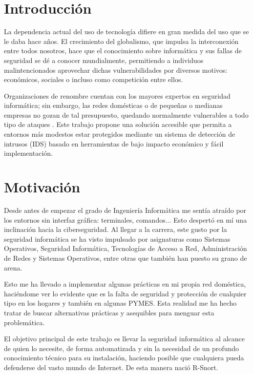 \documentclass[12pt,a4paper]{report}
\begin{document}
\chapter*{Introducción}
La dependencia actual del uso de tecnología difiere en gran medida del uso que se le daba hace años. El crecimiento del globalismo, que impulsa la interconexión entre todos nosotros, hace que el conocimiento sobre informática y sus fallas de seguridad se dé a conocer mundialmente, permitiendo a individuos malintencionados aprovechar dichas vulnerabilidades por diversos motivos: económicos, sociales o incluso como competición entre ellos.\newline

Organizaciones de renombre cuentan con los mayores expertos en seguridad informática; sin embargo, las redes domésticas o de pequeñas o medianas empresas no gozan de tal presupuesto, quedando normalmente vulnerables a todo tipo de ataques \cite{enisa_smes}. Este trabajo propone una solución accesible que permita a entornos más modestos estar protegidos mediante un sistema de detección de intrusos (IDS) basado en herramientas de bajo impacto económico y fácil implementación.

\chapter{Motivación}
Desde antes de empezar el grado de Ingeniería Informática me sentía atraído por los entornos sin interfaz gráfica: terminales, comandos... Esto despertó en mí una inclinación hacia la ciberseguridad. Al llegar a la carrera, este gusto por la seguridad informática se ha visto impulsado por asignaturas como Sistemas Operativos, Seguridad Informática, Tecnologías de Acceso a Red, Administración de Redes y Sistemas Operativos, entre otras que también han puesto su grano de arena.\newline

Esto me ha llevado a implementar algunas prácticas en mi propia red doméstica, haciéndome ver lo evidente que es la falta de seguridad y protección de cualquier tipo en los hogares y también en algunas PYMES. Esta realidad me ha hecho tratar de buscar alternativas prácticas y asequibles para menguar esta problemática.\newline

El objetivo principal de este trabajo es llevar la seguridad informática al alcance de quien lo necesite, de forma automatizada y sin la necesidad de un profundo conocimiento técnico para su instalación, haciendo posible que cualquiera pueda defenderse del vasto mundo de Internet. De esta manera nació R-Snort.\newline
\end{document}
